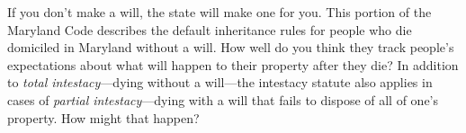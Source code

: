 \item If you don't make a will, the state will make one for you. This portion of
the Maryland Code describes the default inheritance rules for people who die
domiciled in Maryland without a will. How well do you think they track people's
expectations about what will happen to their property after they die? In
addition to \textit{total intestacy}---dying without a will---the intestacy
statute also applies in cases of \textit{partial intestacy}---dying with a
will that fails to dispose of all of one's property. How might that happen?

